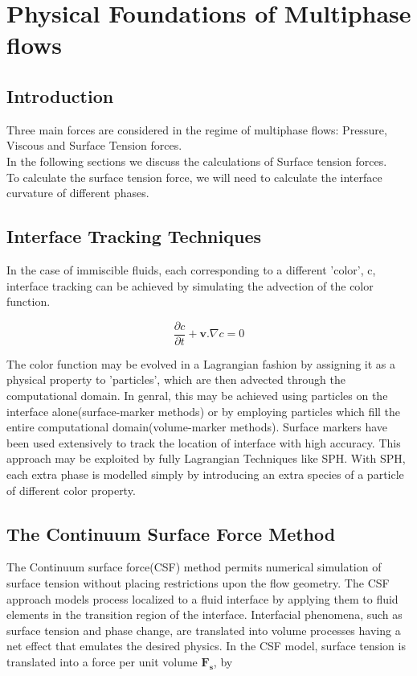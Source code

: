 
\chapter{Physical Foundations of Multiphase flows}

\section{Introduction}
 
Three main forces are considered in the regime of multiphase flows: Pressure, Viscous and Surface Tension forces. \\
\noindent
In the following sections we discuss the calculations of Surface tension forces. \\
\noindent
To calculate the surface tension force, we will need to calculate the interface curvature of different phases.

\section{Interface Tracking Techniques}

In the case of immiscible fluids, each corresponding to a different 'color', c, interface tracking can be achieved by simulating the advection of the color function. \citep{Morris}

\begin{equation}
\frac{\partial c}{\partial t} + \mathbf{v}.\nabla c = 0 
\end{equation}

The color function may be evolved in a Lagrangian fashion by assigning it as a physical property to 'particles', which are then advected through the computational domain. In genral, this may be achieved using particles on the interface alone(surface-marker methods) or by employing particles which fill the entire computational domain(volume-marker methods). Surface markers have been used extensively to track the location of interface with high accuracy. This approach may be exploited by fully Lagrangian Techniques like SPH. With SPH, each extra phase is modelled simply by introducing an extra species of a particle of different color property.

\section{The Continuum Surface Force Method}

The Continuum surface force(CSF) method \citep{Brackbill} permits numerical simulation of surface tension without placing restrictions upon the flow geometry. The CSF approach models process localized to a fluid interface by applying them to fluid elements in the transition region of the interface. Interfacial phenomena, such as surface tension and phase change, are translated into volume processes having a net effect that emulates the desired physics.
In the CSF model, surface tension is translated into a force per unit volume $\mathbf{F_s}$, by

